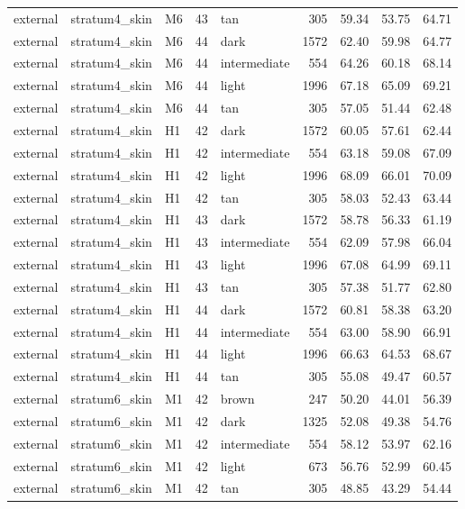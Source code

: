 \begin{tabular}{lllrlrrrr}
external & stratum4\_skin & M6 & 43 & tan & 305 & 59.34 & 53.75 & 64.71 \\
external & stratum4\_skin & M6 & 44 & dark & 1572 & 62.40 & 59.98 & 64.77 \\
external & stratum4\_skin & M6 & 44 & intermediate & 554 & 64.26 & 60.18 & 68.14 \\
external & stratum4\_skin & M6 & 44 & light & 1996 & 67.18 & 65.09 & 69.21 \\
external & stratum4\_skin & M6 & 44 & tan & 305 & 57.05 & 51.44 & 62.48 \\
external & stratum4\_skin & H1 & 42 & dark & 1572 & 60.05 & 57.61 & 62.44 \\
external & stratum4\_skin & H1 & 42 & intermediate & 554 & 63.18 & 59.08 & 67.09 \\
external & stratum4\_skin & H1 & 42 & light & 1996 & 68.09 & 66.01 & 70.09 \\
external & stratum4\_skin & H1 & 42 & tan & 305 & 58.03 & 52.43 & 63.44 \\
external & stratum4\_skin & H1 & 43 & dark & 1572 & 58.78 & 56.33 & 61.19 \\
external & stratum4\_skin & H1 & 43 & intermediate & 554 & 62.09 & 57.98 & 66.04 \\
external & stratum4\_skin & H1 & 43 & light & 1996 & 67.08 & 64.99 & 69.11 \\
external & stratum4\_skin & H1 & 43 & tan & 305 & 57.38 & 51.77 & 62.80 \\
external & stratum4\_skin & H1 & 44 & dark & 1572 & 60.81 & 58.38 & 63.20 \\
external & stratum4\_skin & H1 & 44 & intermediate & 554 & 63.00 & 58.90 & 66.91 \\
external & stratum4\_skin & H1 & 44 & light & 1996 & 66.63 & 64.53 & 68.67 \\
external & stratum4\_skin & H1 & 44 & tan & 305 & 55.08 & 49.47 & 60.57 \\
external & stratum6\_skin & M1 & 42 & brown & 247 & 50.20 & 44.01 & 56.39 \\
external & stratum6\_skin & M1 & 42 & dark & 1325 & 52.08 & 49.38 & 54.76 \\
external & stratum6\_skin & M1 & 42 & intermediate & 554 & 58.12 & 53.97 & 62.16 \\
external & stratum6\_skin & M1 & 42 & light & 673 & 56.76 & 52.99 & 60.45 \\
external & stratum6\_skin & M1 & 42 & tan & 305 & 48.85 & 43.29 & 54.44 \\

\end{tabular}
